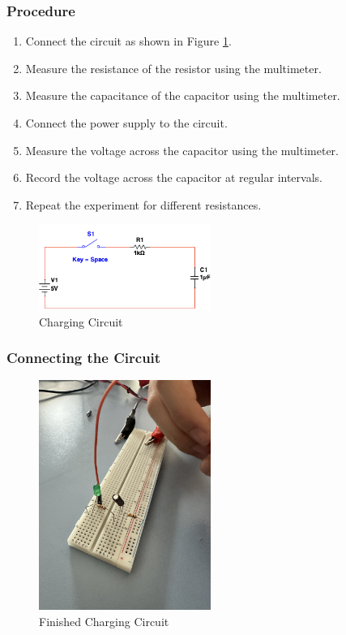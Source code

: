 \documentclass[a4paper, 10pt]{article}
\begin{document}
						\subsubsection{Procedure}
							\begin{enumerate}
								\item Connect the circuit as shown in Figure \ref{fig:charging_circuit}.
								\item Measure the resistance of the resistor using the multimeter.
								\item Measure the capacitance of the capacitor using the multimeter.
								\item Connect the power supply to the circuit.
								\item Measure the voltage across the capacitor using the multimeter.
								\item Record the voltage across the capacitor at regular intervals.
								\item Repeat the experiment for different resistances.
							\end{enumerate}

							\begin{figure}[h!]
								\centering
								\includegraphics[width=0.5\textwidth]{./images/RC_Circuit.png}
								\caption{Charging Circuit}
								\label{fig:charging_circuit}
							\end{figure}

						\subsubsection{Connecting the Circuit}
							\begin{figure}[h!]
								\centering
								\includegraphics[width=0.5\textwidth]{./images/Finished_RC_Circuit.JPG}
								\caption{Finished Charging Circuit}
								\label{fig:finished_charging_circuit}
							\end{figure}
\end{document}
